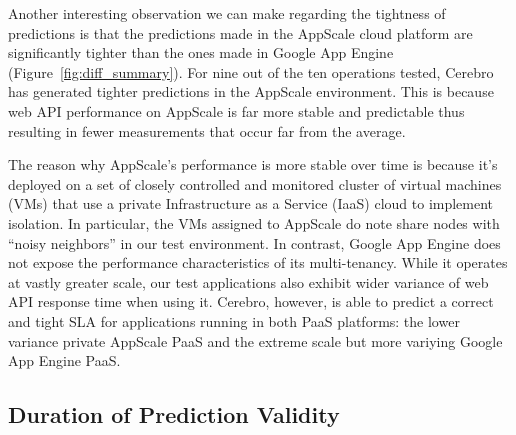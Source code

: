 Another interesting observation we can make regarding the tightness of
predictions is that the predictions made in the AppScale cloud platform are
significantly tighter than the ones made in Google App Engine
(Figure~\ref{fig:diff_summary}). 
For nine out of the ten operations tested, Cerebro has generated tighter
predictions in the AppScale environment. This is because web API performance
on AppScale is far more stable and predictable thus resulting in fewer
measurements that occur far from the average.

The reason why AppScale's performance is more stable over time is because it's deployed on a set of closely controlled 
and monitored cluster of virtual machines (VMs) that use a private
Infrastructure as a
Service (IaaS) cloud to implement isolation.  In particular, the 
VMs assigned to AppScale do note share nodes with ``noisy neighbors'' in our
test environment.  In contrast, Google App Engine does not expose the
performance characteristics of its multi-tenancy.  While it operates at vastly
greater scale, our test applications also exhibit wider variance of web API
response time when using it.
Cerebro, however, is able to predict a correct and tight SLA for applications
running in both PaaS platforms: the lower variance private
AppScale PaaS and the extreme scale but more variying Google App Engine PaaS.

\subsection{Duration of Prediction Validity}


